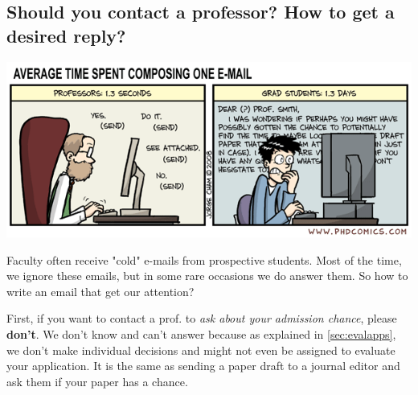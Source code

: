 \documentclass[oneside,11pt]{book}
\begin{document}


\subsection{Should you contact a professor? How to get a desired reply?}\label{sec:contact}


\begin{center}
  \includegraphics[scale=0.6]{files/emails.png}
\end{center}


Faculty often receive "cold" e-mails from prospective students. Most of the time, we ignore these emails, but in some rare occasions we do answer them. So how to write an email that get our attention?



First, if you want to contact a prof. to \emph{ask about your admission chance}, please \textbf{don't}. We don't know and can't answer because as explained in \autoref{sec:evalapps}, we don't make individual decisions and might not even be assigned to evaluate your application.  It is the same as sending a paper draft to a journal editor and ask them if your paper has a chance.
\end{document}
